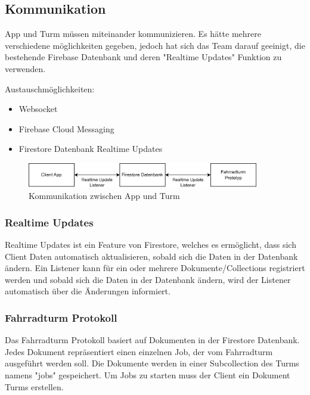 \subsection{Kommunikation}

App und Turm müssen miteinander kommunizieren. Es hätte mehrere verschiedene möglichkeiten gegeben, jedoch hat sich das Team darauf geeinigt, die bestehende Firebase Datenbank und deren "Realtime Updates" Funktion zu verwenden.

Austauschmöglichkeiten:
\begin{itemize}
  \item Websocket
  \item Firebase Cloud Messaging
  \item Firestore Datenbank Realtime Updates
\end{itemize}

\begin{figure}[ht]
  \centering
  \includegraphics[width=0.9\textwidth]{images/kommunikation.png}
  \caption{Kommunikation zwischen App und Turm}
  \label{fig:kommunikation}
\end{figure}

\subsubsection{Realtime Updates}

Realtime Updates ist ein Feature von Firestore, welches es ermöglicht, dass sich Client Daten automatisch aktualisieren, sobald sich die Daten in der Datenbank ändern. Ein Listener kann für ein oder mehrere Dokumente/Collections registriert werden und sobald sich die Daten in der Datenbank ändern, wird der Listener automatisch über die Änderungen informiert.

\subsubsection{Fahrradturm Protokoll}

Das Fahrradturm Protokoll basiert auf Dokumenten in der Firestore Datenbank. Jedes Dokument repräsentiert einen einzelnen Job, der vom Fahrradturm ausgeführt werden soll. Die Dokumente werden in einer Subcollection des Turms namens "jobs" gespeichert. Um Jobs zu starten muss der Client ein Dokument Turms erstellen.

